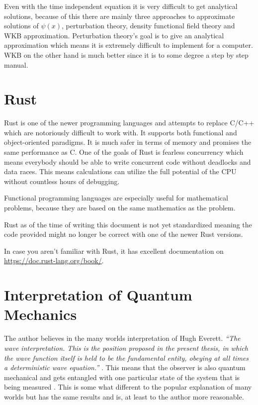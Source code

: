 \documentclass[11pt,DIV=10,final]{scrreprt} %
\begin{document}
Even with the time independent equation it is very difficult to get analytical solutions, because of this there are mainly three approaches to
approximate solutions of $\psi(x)$, perturbation theory, density functional field theory and WKB approximation. Perturbation theory's goal is to give an analytical approximation which means it
is extremely difficult to implement for a computer. WKB on the other hand is much better since it is to some degree a step by step manual.
\section{Rust}
Rust is one of the newer programming languages and attempts to replace C/C++ which are notoriously difficult to work with. It supports both functional and object-oriented paradigms. It is much safer in terms of memory and promises the same performance as C. One of the goals of Rust is fearless concurrency which means everybody should
be able to write concurrent code without deadlocks and data races. This means calculations can utilize the full potential of the CPU without countless hours of debugging.

Functional programming languages are especially useful for mathematical problems, because they are based on the same mathematics as the problem.

Rust as of the time of writing this document is not yet standardized meaning the code provided might no longer be correct with one of the newer Rust versions.

In case you aren't familiar with Rust, it has excellent documentation on \url{https://doc.rust-lang.org/book/}.

\section{Interpretation of Quantum Mechanics}
The author believes in the many worlds interpretation of Hugh Everett. \emph{``The wave interpretation. This is the position proposed in the present thesis, in which the wave function itself is held to be
the fundamental entity, obeying at all times a deterministic wave equation.''} \citep[p. 115]{dewitt2015many}. This means that the observer is also quantum mechanical and gets entangled with one particular
state of the system that is being measured \citep[p. 116]{dewitt2015many}. This is some what different to the popular explanation of many worlds but has the same results and is, at least to the author
more reasonable.
\end{document}
